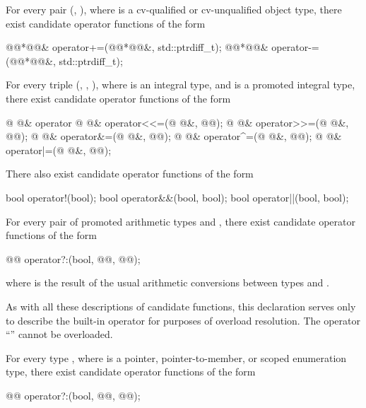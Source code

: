 \pnum
For every pair
(,
),
where
is a cv-qualified or cv-unqualified object type,
there exist candidate operator functions of the form

\begin{codeblock}
@@*@@&   operator+=(@@*@@&, std::ptrdiff_t);
@@*@@&   operator-=(@@*@@&, std::ptrdiff_t);
\end{codeblock}

\pnum
For every triple
(,
,
),
where
is an integral type, and
is a promoted integral type,
there exist candidate operator functions of the form

\begin{codeblock}
@ @&   operator%
@ @&   operator<<=(@ @&, @@);
@ @&   operator>>=(@ @&, @@);
@ @&   operator&=(@ @&, @@);
@ @&   operator^=(@ @&, @@);
@ @&   operator|=(@ @&, @@);
\end{codeblock}

\pnum
There also exist candidate operator functions of the form

\begin{codeblock}
bool    operator!(bool);
bool    operator&&(bool, bool);
bool    operator||(bool, bool);
\end{codeblock}

\pnum
For every pair of promoted arithmetic types
and
,
there exist candidate operator functions of the form

\begin{codeblock}
@@      operator?:(bool, @@, @@);
\end{codeblock}

where
is the result of the usual arithmetic conversions between types
and
.
\begin{note}
As with all these descriptions of candidate functions, this declaration serves
only to describe the built-in operator for purposes of overload resolution.
The operator
``''
cannot be overloaded.
\end{note}

\pnum
For every type
,
where
is a pointer, pointer-to-member, or scoped enumeration type, there exist candidate operator
functions of the form

\begin{codeblock}
@@       operator?:(bool, @@, @@);
\end{codeblock}%
